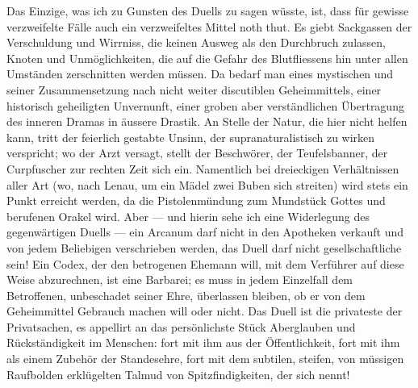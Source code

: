 Das Einzige, was ich zu Gunsten des Duells zu sagen wüsste, ist, dass für gewisse verzweifelte Fälle auch ein verzweifeltes Mittel noth thut. Es giebt Sackgassen der Verschuldung und Wirrniss, die keinen Ausweg als den Durchbruch zulassen, Knoten und Unmöglichkeiten, die auf die Gefahr des Blutfliessens hin unter allen Umständen zerschnitten werden müssen. Da bedarf man eines mystischen und seiner Zusammensetzung nach nicht weiter discutiblen Geheimmittels, einer historisch geheiligten Unvernunft, einer groben aber verständlichen Übertragung des inneren Dramas in äussere Drastik. An Stelle der Natur, die hier nicht helfen kann, tritt der feierlich gestabte Unsinn, der supranaturalistisch zu wirken verspricht; wo der Arzt versagt, stellt der Beschwörer, der Teufelsbanner, der Curpfuscher zur rechten Zeit sich ein. Namentlich bei dreieckigen Verhältnissen aller Art (wo, nach Lenau, um ein Mädel zwei Buben sich streiten) wird stets ein Punkt erreicht werden, da die Pistolenmündung zum Mundstück Gottes und berufenen Orakel wird. Aber — und hierin sehe ich eine Widerlegung des gegenwärtigen Duells — ein Arcanum darf nicht in den Apotheken verkauft und von jedem Beliebigen verschrieben werden, das Duell darf nicht gesellschaftliche  sein! Ein Codex, der den betrogenen Ehemann  will, mit dem Verführer auf diese Weise abzurechnen, ist eine Barbarei; es muss in jedem Einzelfall dem Betroffenen, unbeschadet seiner Ehre, überlassen bleiben, ob er von dem Geheimmittel Gebrauch machen will oder nicht. Das Duell ist die privateste der Privatsachen, es appellirt an das persönlichste Stück Aberglauben und Rückständigkeit im Menschen: fort mit ihm aus der Öffentlichkeit, fort mit ihm als einem Zubehör der Standesehre, fort mit dem subtilen, steifen, von müssigen Raufbolden erklügelten Talmud von Spitzfindigkeiten, der sich  nennt!
\par

